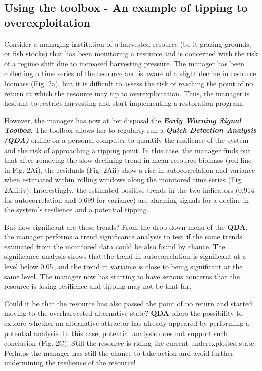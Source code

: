 \documentclass[12pt,a4paper,final]{article}
\begin{document}
\begin{doublespacing}
\subsection{Using the toolbox - An example of tipping to overexploitation}
Consider a managing institution of a harvested resource (be it grazing grounds, or fish stocks) that has been monitoring a resource and is concerned with the risk of a regime shift due to increased harvesting pressure. The manager has been collecting a time series of the resource and is aware of a slight decline in resource biomass (Fig. 2a), but it is difficult to assess the risk of reaching the point of no return at which the resource may tip to overexploitation. Thus, the manager is hesitant to restrict harvesting and start implementing a restoration program. 

However, the manager has now at her disposal the \textbf{\textit{Early Warning Signal Toolbox}}. The toolbox allows her to regularly run a \textbf{\textit{Quick Detection Analysis (QDA)}} online on a personal computer to quantify the resilience of the system and the risk of approaching a tipping point. In this case, the manager finds out that after removing the slow declining trend in mean resource biomass (red line in Fig. 2Ai), the residuals (Fig. 2Aii) show a rise in autocorrelation and variance when estimated within rolling windows along the monitored time series (Fig. 2Aiii,iv). %
Interestingly, the estimated positive trends in the two indicators (0.914 for autocorrelation and 0.699 for variance) are alarming signals for a decline in the system's resilience and a potential tipping. 

But how significant are these trends? From the drop-down menu of the \textbf{QDA}, the manager performs a trend significance analysis to test if the same trends estimated from the monitored data could be also found by chance. The significance analysis shows that the trend in autocorrelation is significant at a level below 0.05, and the trend in variance is close to being significant at the same level. The manager now has starting to have serious concerns that the resource is losing resilience and tipping may not be that far. 

Could it be that the resource has also passed the point of no return and started moving to the overharvested alternative state? \textbf{QDA} offers the possibility to explore whether an alternative attractor has already appeared by performing a potential analysis. In this case, potential analysis does not support such conclusion (Fig. 2C). Still the resource is riding the current underexploited state. Perhaps the manager has still the chance to take action and avoid further undermining the resilience of the resource!\\


\end{doublespacing}
\end{document}
